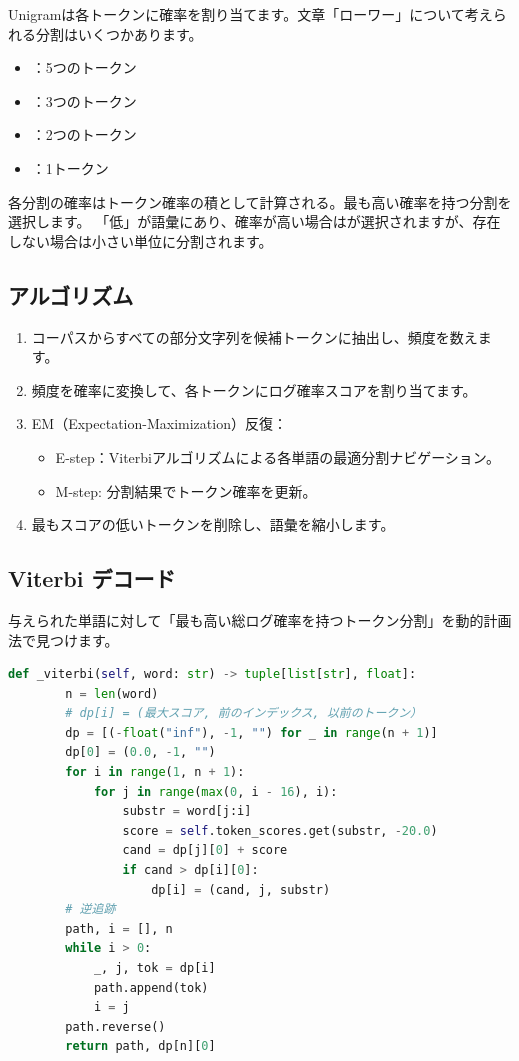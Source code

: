 Unigramは各トークンに確率を割り当てます。文章「ローワー」について考えられる分割はいくつかあります。
\begin{itemize}
\item\code{[l, o, w, e, r]}：5つのトークン
\item\code{[lo, w, er]}：3つのトークン
\item\code{[low, er]}：2つのトークン
\item\code{[lower]}：1トークン
\end{itemize}

各分割の確率はトークン確率の積として計算される。最も高い確率を持つ分割を選択します。 「低」が語彙にあり、確率が高い場合は\code{[lower]}が選択されますが、存在しない場合は小さい単位に分割されます。

\subsection{アルゴリズム}

\begin{enumerate}
\item コーパスからすべての部分文字列を候補トークンに抽出し、頻度を数えます。
\item 頻度を確率に変換して、各トークンにログ確率スコアを割り当てます。
\item EM（Expectation-Maximization）反復：
    \begin{itemize}
\item E-step：Viterbiアルゴリズムによる各単語の最適分割ナビゲーション。
\item M-step: 分割結果でトークン確率を更新。
    \end{itemize}
\item 最もスコアの低いトークンを削除し、語彙を縮小します。
\end{enumerate}

\subsection{Viterbi デコード}

与えられた単語に対して「最も高い総ログ確率を持つトークン分割」を動的計画法で見つけます。

\begin{lstlisting}[language=Python]
    def _viterbi(self, word: str) -> tuple[list[str], float]:
        n = len(word)
        # dp[i] = (最大スコア, 前のインデックス, 以前のトークン）
        dp = [(-float("inf"), -1, "") for _ in range(n + 1)]
        dp[0] = (0.0, -1, "")
        for i in range(1, n + 1):
            for j in range(max(0, i - 16), i):
                substr = word[j:i]
                score = self.token_scores.get(substr, -20.0)
                cand = dp[j][0] + score
                if cand > dp[i][0]:
                    dp[i] = (cand, j, substr)
        # 逆追跡
        path, i = [], n
        while i > 0:
            _, j, tok = dp[i]
            path.append(tok)
            i = j
        path.reverse()
        return path, dp[n][0]
\end{lstlisting}

